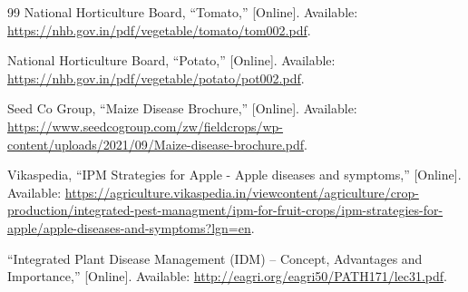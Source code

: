 \documentclass[12pt, a4paper]{report}
\begin{document}
\begin{thebibliography}{99}
National Horticulture Board, ``Tomato,'' [Online]. Available: \url{https://nhb.gov.in/pdf/vegetable/tomato/tom002.pdf}.

National Horticulture Board, ``Potato,'' [Online]. Available: \url{https://nhb.gov.in/pdf/vegetable/potato/pot002.pdf}.

Seed Co Group, ``Maize Disease Brochure,'' [Online]. Available: \url{https://www.seedcogroup.com/zw/fieldcrops/wp-content/uploads/2021/09/Maize-disease-brochure.pdf}.

Vikaspedia, ``IPM Strategies for Apple - Apple diseases and symptoms,'' [Online]. Available: \url{https://agriculture.vikaspedia.in/viewcontent/agriculture/crop-production/integrated-pest-managment/ipm-for-fruit-crops/ipm-strategies-for-apple/apple-diseases-and-symptoms?lgn=en}.

``Integrated Plant Disease Management (IDM) – Concept, Advantages and Importance,'' [Online]. Available: \url{http://eagri.org/eagri50/PATH171/lec31.pdf}.

\end{thebibliography}
\end{document}
